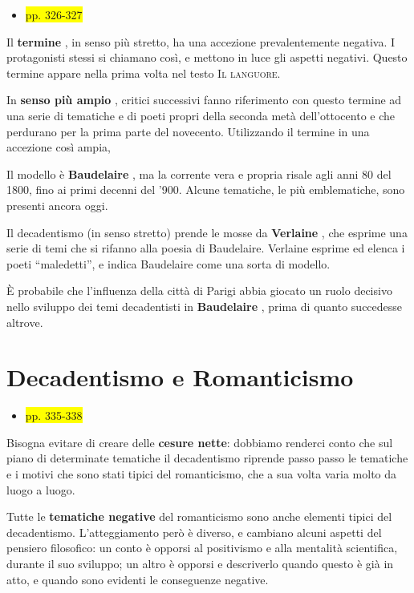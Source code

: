 \documentclass{book}
\newcommand{\pagine}[1]{\colorbox{yellow}{#1}}
\newcommand{\evidenziatore}[1]{\textbf{#1}}
\begin{document}
\begin{itemize}
\item
  \pagine{pp. 326-327}
\end{itemize}

Il \evidenziatore{termine} , in senso più stretto, ha una accezione
prevalentemente negativa. I protagonisti stessi si chiamano così, e
mettono in luce gli aspetti negativi. Questo termine appare nella prima
volta nel testo \textsc{Il languore}.

In \evidenziatore{senso più ampio} , critici successivi fanno
riferimento con questo termine ad una serie di tematiche e di poeti
propri della seconda metà dell'ottocento e che perdurano per la prima
parte del novecento. Utilizzando il termine in una accezione così ampia,

Il modello è \evidenziatore{\textbf{Baudelaire}} , ma la corrente vera e
propria risale agli anni 80 del 1800, fino ai primi decenni del '900.
Alcune tematiche, le più emblematiche, sono presenti ancora oggi.

Il decadentismo (in senso stretto) prende le mosse da
\evidenziatore{Verlaine} , che esprime una serie di temi che si rifanno
alla poesia di Baudelaire. Verlaine esprime ed elenca i poeti
``maledetti'', e indica Baudelaire come una sorta di modello.

È probabile che l'influenza della città di Parigi abbia giocato un ruolo
decisivo nello sviluppo dei temi decadentisti in
\evidenziatore{Baudelaire} , prima di quanto succedesse altrove.

\section{Decadentismo e Romanticismo}

\begin{itemize}
\item
  \pagine{pp. 335-338}
\end{itemize}

Bisogna evitare di creare delle \evidenziatore{cesure nette}: dobbiamo
renderci conto che sul piano di determinate tematiche il decadentismo
riprende passo passo le tematiche e i motivi che sono stati tipici del
romanticismo, che a sua volta varia molto da luogo a luogo.

Tutte le \evidenziatore{tematiche negative} del romanticismo sono anche
elementi tipici del decadentismo. L'atteggiamento però è diverso, e
cambiano alcuni aspetti del pensiero filosofico: un conto è opporsi al
positivismo e alla mentalità scientifica, durante il suo sviluppo; un
altro è opporsi e descriverlo quando questo è già in atto, e quando sono
evidenti le conseguenze negative.
\end{document}
